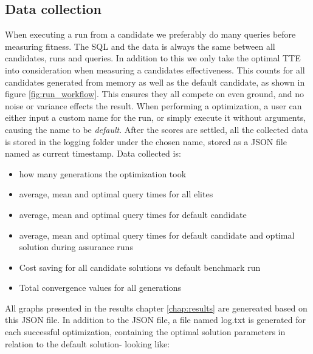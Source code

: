 \documentclass[a4paper,english]{report}
\begin{document}
			\subsection{Data collection}
				When executing a run from a candidate we preferably do many queries before measuring fitness. The SQL and the data is always the same between all candidates, runs and queries. In addition to this we only take the optimal TTE into consideration when measuring a candidates effectiveness. This counts for all candidates generated from memory as well as the default candidate, as shown in figure \ref{fig:run_workflow}. This ensures they all compete on even ground, and no noise or variance effects the result. When performing a optimization, a user can either input a custom name for the run, or simply execute it without arguments, causing the name to be \textit{default}. After the scores are settled, all the collected data is stored in the logging folder under the chosen name, stored as a JSON file named as current timestamp. Data collected is:
				\begin{itemize}
					\item how many generations the optimization took
					\item average, mean and optimal query times for all elites
					\item average, mean and optimal query times for default candidate
					\item average, mean and optimal query times for default candidate and optimal solution during assurance runs
					\item Cost saving for all candidate solutions vs default benchmark run
					\item Total convergence values for all generations
				\end{itemize}
				All graphs presented in the results chapter \ref{chap:results} are genereated based on this JSON file. In addition to the JSON file, a file named log.txt is generated for each successful optimization, containing the optimal solution parameters in relation to the default solution- looking like:
				\scriptsize
\end{document}
